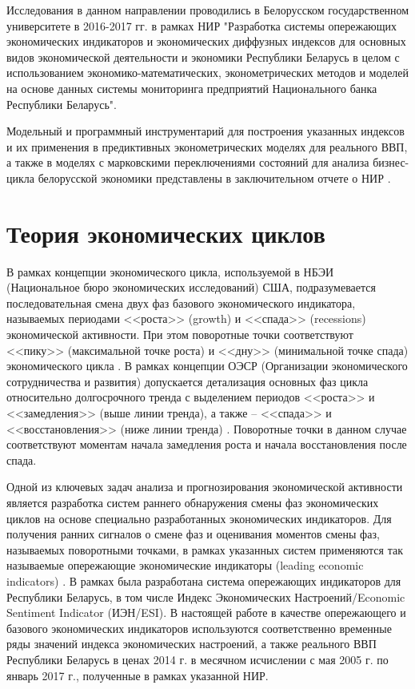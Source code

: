 \documentclass[a4paper,14pt]{extreport}
\begin{document}
	Исследования в данном направлении проводились в Белорусском государственном университете в 2016-2017 гг. в рамках НИР "Разработка системы опережающих экономических индикаторов и экономических диффузных индексов для основных видов экономической деятельности и экономики Республики Беларусь в целом с использованием экономико-математических, эконометрических методов и моделей на основе данных системы мониторинга предприятий Национального банка Республики Беларусь".
	
	Модельный и программный инструментарий для построения указанных  индексов и их применения в предиктивных эконометрических моделях для реального ВВП, а также в моделях с марковскими переключениями состояний для анализа бизнес-цикла белорусской экономики представлены в заключительном отчете о НИР \cite{esiMaking}.
	
	\section{Теория экономических циклов}
	
	В рамках концепции экономического цикла, используемой в НБЭИ (Национальное бюро экономических исследований) США, подразумевается последовательная смена двух фаз базового экономического индикатора, называемых периодами <<роста>> (growth)  и <<спада>> (recessions) экономической активности. При этом поворотные точки соответствуют <<пику>> (максимальной точке роста) и <<дну>> (минимальной точке спада) экономического цикла \cite{nberDevelopment}.  В рамках концепции ОЭСР (Организации экономического сотрудничества и развития) допускается  детализация основных фаз цикла относительно долгосрочного тренда с выделением периодов <<роста>> и <<замедления>> (выше линии тренда), а также  – <<спада>> и <<восстановления>>  (ниже линии тренда) \cite{oecdCycleExtraction}. Поворотные точки в данном случае соответствуют моментам начала замедления роста и начала восстановления после спада. 
	
	Одной из ключевых задач анализа и прогнозирования экономической активности является разработка систем раннего обнаружения смены фаз экономических циклов на основе специально разработанных экономических индикаторов. Для получения ранних сигналов о смене фаз и оценивания моментов смены фаз, называемых поворотными точками, в рамках указанных систем применяются так называемые опережающие экономические индикаторы (leading economic indicators) \cite{oecdCLI}. В рамках \cite{esiMaking,esiExtra} была разработана система опережающих индикаторов для Республики Беларусь, в том числе Индекс Экономических Настроений/Economic Sentiment Indicator (ИЭН/ESI). В настоящей работе в качестве опережающего и базового экономических индикаторов используются соответственно временные ряды значений индекса экономических настроений, а также реального ВВП Республики Беларусь в ценах 2014 г. в месячном исчислении с мая 2005 г. по январь 2017 г., полученные в рамках указанной НИР.
	
\end{document}
